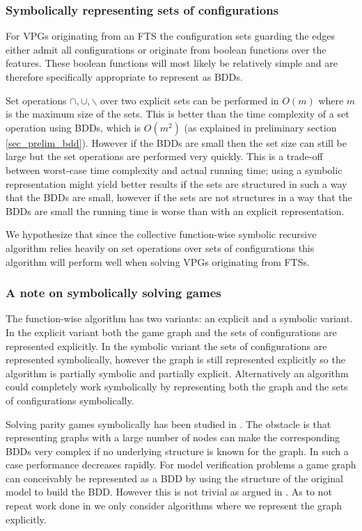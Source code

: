 \subsubsection{Symbolically representing sets of configurations}
\label{sec:symrepconfs}
For VPGs originating from an FTS the configuration sets guarding the edges either admit all configurations or originate from boolean functions over the features. These boolean functions will most likely be relatively simple and are therefore specifically appropriate to represent as BDDs.

Set operations $\cap,\cup,\backslash$ over two explicit sets can be performed in $O(m)$ where $m$ is the maximum size of the sets. This is better than the time complexity of a set operation using BDDs, which is $O(m^2)$ (as explained in preliminary section \ref{sec_prelim_bdd}). However if the BDDs are small then the set size can still be large but the set operations are performed very quickly. This is a trade-off between worst-case time complexity and actual running time; using a symbolic representation might yield better results if the sets are structured in such a way that the BDDs are small, however if the sets are not structures in a way that the BDDs are small the running time is worse than with an explicit representation.

We hypothesize that since the collective function-wise symbolic recursive algorithm relies heavily on set operations over sets of configurations this algorithm will perform well when solving VPGs originating from FTSs.

\subsubsection{A note on symbolically solving games}
The function-wise algorithm has two variants: an explicit and a symbolic variant. In the explicit variant both the game graph and the sets of configurations are represented explicitly. In the symbolic variant the sets of configurations are represented symbolically, however the graph is still represented explicitly so the algorithm is partially symbolic and partially explicit. Alternatively an algorithm could completely work symbolically by representing both the graph and the sets of configurations symbolically.

Solving parity games symbolically has been studied in \cite{BDDSolvingPG}. The obstacle is that representing graphs with a large number of nodes can make the corresponding BDDs very complex if no underlying structure is known for the graph. In such a case performance decreases rapidly. For model verification problems a game graph can conceivably be represented as a BDD by using the structure of the original model to build the BDD. However this is not trivial as argued in \cite{BDDSolvingPG}. As to not repeat work done in \cite{BDDSolvingPG} we only consider algorithms where we represent the graph explicitly. 

